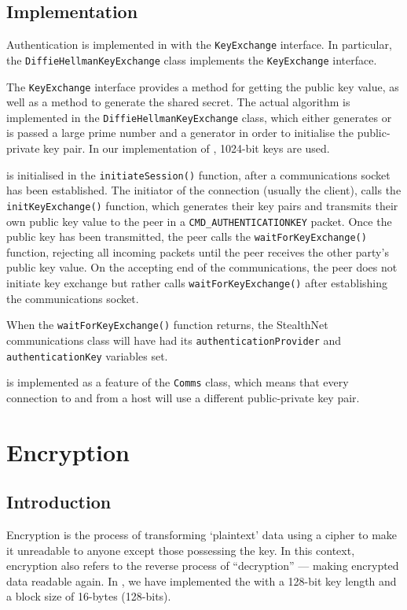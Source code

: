 \documentclass[a4paper,11pt]{article}
\begin{document}
\subsection{Implementation}
Authentication is implemented in \packageName{} with the 
\verb+KeyExchange+ interface. In particular, the \verb+DiffieHellmanKeyExchange+
class implements the \verb+KeyExchange+ interface.

The \verb+KeyExchange+ interface provides a method for getting the public key
value, as well as a method to generate the shared secret. The actual 
 algorithm is implemented in the 
\verb+DiffieHellmanKeyExchange+ class, which either generates or is passed a 
large prime number and a generator in order to initialise the 
 public-private key pair. In our implementation of 
, 1024-bit keys are used.

 is initialised in the 
\verb+initiateSession()+ function, after a communications socket has been 
established. The initiator of the connection (usually the client), calls the
\verb+initKeyExchange()+ function, which generates their 
 key pairs and transmits their own public key value to
the peer in a \verb+CMD_AUTHENTICATIONKEY+ packet. Once the public key has been 
transmitted, the \serviceName{} peer calls the \verb+waitForKeyExchange()+ 
function, rejecting all incoming packets until the peer receives the other
party's public key value. On the accepting end of the communications, the peer
does not initiate key exchange but rather calls \verb+waitForKeyExchange()+ 
after establishing the communications socket.

When the \verb+waitForKeyExchange()+ function returns, the StealthNet 
communications class will have had its \verb+authenticationProvider+ and \\
\verb+authenticationKey+ variables set.

 is implemented as a feature of the
\serviceName{} \verb+Comms+ class, which means that every connection to and from
a host will use a different public-private key pair.
 
\section{Encryption}

\subsection{Introduction}
Encryption is the process of transforming `plaintext' data using a cipher to 
make it unreadable to anyone except those possessing the key. In this context,
encryption also refers to the reverse process of ``decryption'' --- making
encrypted data readable again. In \packageName{}, we have implemented the
 with a 128-bit key length and a 
block size of 16-bytes (128-bits).
\end{document}
